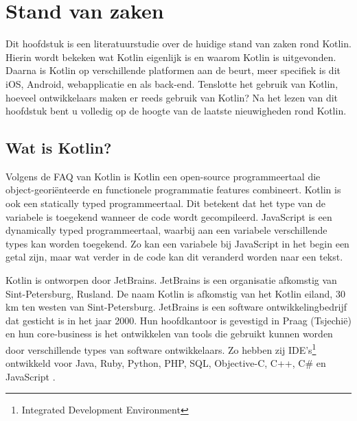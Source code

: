 \chapter{Stand van zaken}
\label{ch:stand-van-zaken}



Dit hoofdstuk is een literatuurstudie over de huidige stand van zaken rond Kotlin. Hierin wordt bekeken wat Kotlin eigenlijk is en waarom Kotlin is uitgevonden. Daarna is Kotlin op verschillende platformen aan de beurt, meer specifiek is dit iOS, Android, webapplicatie en als back-end. Tenslotte het gebruik van Kotlin, hoeveel ontwikkelaars maken er reeds gebruik van Kotlin? Na het lezen van dit hoofdstuk bent u volledig op de hoogte van de laatste nieuwigheden rond Kotlin.

\section{Wat is Kotlin?}
\label{sec:kotlin}
Volgens de FAQ van Kotlin \autocite{JetBrainsFAQ} is Kotlin een open-source programmeertaal die object-georiënteerde en functionele programmatie features combineert. Kotlin is ook een statically typed programmeertaal. Dit betekent dat het type van de variabele is toegekend wanneer de code wordt gecompileerd. JavaScript is een dynamically typed programmeertaal, waarbij aan een variabele verschillende types kan worden toegekend. Zo kan een variabele bij JavaScript in het begin een getal zijn, maar wat verder in de code kan dit veranderd worden naar een tekst.

Kotlin is ontworpen door JetBrains. JetBrains is een organisatie afkomstig van Sint-Petersburg, Rusland. De naam Kotlin is afkomstig van het Kotlin eiland, 30 km ten westen van Sint-Petersburg. JetBrains is een software ontwikkelingbedrijf dat gesticht is in het jaar 2000. Hun hoofdkantoor is gevestigd in Praag (Tsjechië) en hun core-business is het ontwikkelen van tools die gebruikt kunnen worden door verschillende types van software ontwikkelaars. Zo hebben zij IDE's\footnote{Integrated Development Environment} ontwikkeld voor Java, Ruby, Python, PHP, SQL, Objective-C, C++, C\# en JavaScript \autocite{JetBrainsOverView}.


